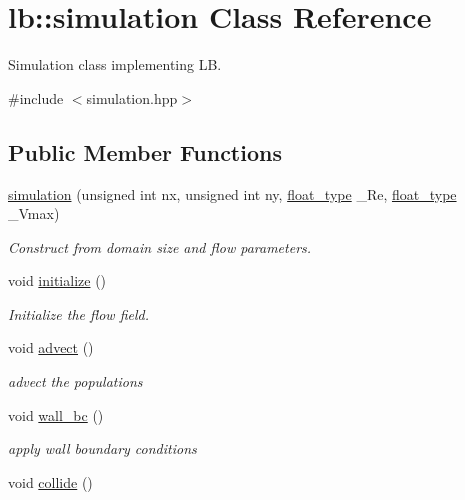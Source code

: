 \hypertarget{classlb_1_1simulation}{\section{lb\-:\-:simulation \-Class \-Reference}
\label{classlb_1_1simulation}
}


\-Simulation class implementing \-L\-B.  




{\ttfamily \#include $<$simulation.\-hpp$>$}

\subsection*{\-Public \-Member \-Functions}
\begin{DoxyCompactItemize}
\item 
\hyperlink{classlb_1_1simulation_affd283b0c1c374a96999e41f0945c94b}{simulation} (unsigned int nx, unsigned int ny, \hyperlink{namespacelb_a2b37d1585aef2d3da421ad0aedc6b11b}{float\-\_\-type} \-\_\-\-Re, \hyperlink{namespacelb_a2b37d1585aef2d3da421ad0aedc6b11b}{float\-\_\-type} \-\_\-\-Vmax)
\begin{DoxyCompactList}\small\item\em \-Construct from domain size and flow parameters. \end{DoxyCompactList}\item 
void \hyperlink{classlb_1_1simulation_a4be270474feac82cb59a37d7bc050b9d}{initialize} ()
\begin{DoxyCompactList}\small\item\em \-Initialize the flow field. \end{DoxyCompactList}\item 
void \hyperlink{classlb_1_1simulation_aa9b4e728e592f75cc75f8b2b0cbf9029}{advect} ()
\begin{DoxyCompactList}\small\item\em advect the populations \end{DoxyCompactList}\item 
\hypertarget{classlb_1_1simulation_aa124a075107ffddce508b3e94f143c43}{void \hyperlink{classlb_1_1simulation_aa124a075107ffddce508b3e94f143c43}{wall\-\_\-bc} ()}\label{classlb_1_1simulation_aa124a075107ffddce508b3e94f143c43}

\begin{DoxyCompactList}\small\item\em apply wall boundary conditions \end{DoxyCompactList}\item 
\hypertarget{classlb_1_1simulation_a63daa38571618a165ba5ffc3b8c279d9}{void \hyperlink{classlb_1_1simulation_a63daa38571618a165ba5ffc3b8c279d9}{collide} ()}\label{classlb_1_1simulation_a63daa38571618a165ba5ffc3b8c279d9}


\end{DoxyCompactItemize}
